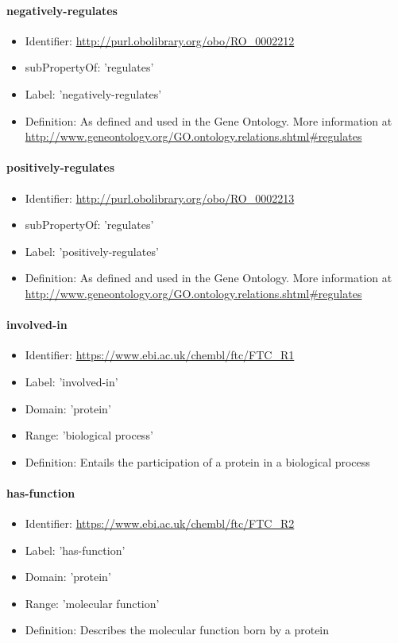 \paragraph{negatively-regulates}
\begin{itemize}
  \item Identifier: \url{http://purl.obolibrary.org/obo/RO\_0002212}
  \item subPropertyOf: 'regulates'
  \item Label: 'negatively-regulates'
  \item Definition: As defined and used in the Gene Ontology. More information at \url{http://www.geneontology.org/GO.ontology.relations.shtml\#regulates}
\end{itemize}

\paragraph{positively-regulates}
\begin{itemize}
  \item Identifier: \url{http://purl.obolibrary.org/obo/RO\_0002213}
  \item subPropertyOf: 'regulates'
  \item Label: 'positively-regulates'
  \item Definition: As defined and used in the Gene Ontology. More information at \url{http://www.geneontology.org/GO.ontology.relations.shtml\#regulates}
\end{itemize}

\paragraph{involved-in}
\begin{itemize}
  \item Identifier: \url{https://www.ebi.ac.uk/chembl/ftc/FTC\_R1}
  \item Label: 'involved-in'
  \item Domain: 'protein'
  \item Range: 'biological process'
  \item Definition: Entails the participation of a protein in a biological process
\end{itemize}

\paragraph{has-function}
\begin{itemize}
  \item Identifier: \url{https://www.ebi.ac.uk/chembl/ftc/FTC\_R2}
  \item Label: 'has-function'
  \item Domain: 'protein'
  \item Range: 'molecular function'
  \item Definition: Describes the molecular function born by a protein
\end{itemize}

